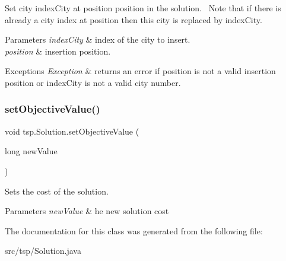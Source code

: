 Set city index\+City at position position in the solution.~\newline
 Note that if there is already a city index at position then this city is replaced by index\+City.


\begin{DoxyParams}{Parameters}
{\em index\+City} & index of the city to insert. \\
\hline
{\em position} & insertion position. \\
\hline
\end{DoxyParams}

\begin{DoxyExceptions}{Exceptions}
{\em Exception} & returns an error if position is not a valid insertion position or index\+City is not a valid city number. \\
\hline
\end{DoxyExceptions}
\mbox{\label{classtsp_1_1_solution_a5cff3a62643a336a021da631afd9f9cb}} 
\subsubsection{\texorpdfstring{set\+Objective\+Value()}{setObjectiveValue()}}
{\footnotesize\ttfamily void tsp.\+Solution.\+set\+Objective\+Value (\begin{DoxyParamCaption}\item[{long}]{new\+Value }\end{DoxyParamCaption})\hspace{0.3cm}{\ttfamily [inline]}}

Sets the cost of the solution. 
\begin{DoxyParams}{Parameters}
{\em new\+Value} & he new solution cost \\
\hline
\end{DoxyParams}


The documentation for this class was generated from the following file\+:\begin{DoxyCompactItemize}
\item 
src/tsp/Solution.\+java\end{DoxyCompactItemize}

